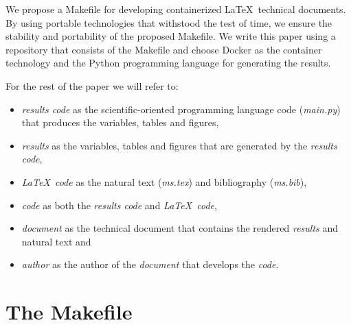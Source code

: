 \documentclass[journal]{IEEEtran}
\begin{document}
We propose a Makefile for developing containerized \LaTeX\ technical documents.
By using portable technologies that withstood the test of time, we ensure the stability and portability of the proposed Makefile.
We write this paper using a repository that consists of the Makefile and choose Docker as the container technology and the Python programming language for generating the results.

For the rest of the paper we will refer to:
\begin{itemize}
	\item \textit{results code} as the scientific-oriented programming language code (\textit{main.py}) that produces the variables, tables and figures,
	\item \textit{results} as the variables, tables and figures that are generated by the \textit{results code},
	\item \textit{\LaTeX\ code} as the natural text (\textit{ms.tex}) and bibliography (\textit{ms.bib}),
	\item \textit{code} as both the \textit{results code} and \textit{\LaTeX\ code},
	\item \textit{document} as the technical document that contains the rendered \textit{results} and natural text and
	\item \textit{author} as the author of the \textit{document} that develops the \textit{code}.
\end{itemize}

\section{The Makefile}
\end{document}
